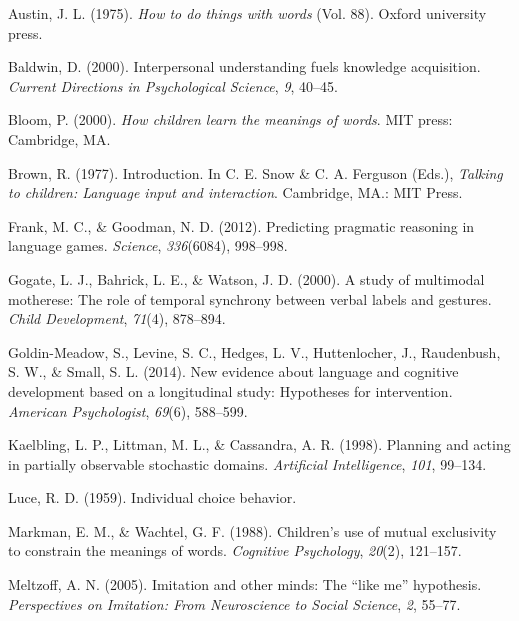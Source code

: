 \documentclass[10pt, letterpaper]{article}
\begin{document}
\setlength{\parindent}{-0.1in} \setlength{\leftskip}{0.125in}

\noindent

\hypertarget{refs}{}
\hypertarget{ref-austin1975}{}
Austin, J. L. (1975). \emph{How to do things with words} (Vol. 88).
Oxford university press.

\hypertarget{ref-baldwin2000}{}
Baldwin, D. (2000). Interpersonal understanding fuels knowledge
acquisition. \emph{Current Directions in Psychological Science},
\emph{9}, 40--45.

\hypertarget{ref-bloom2000}{}
Bloom, P. (2000). \emph{How children learn the meanings of words}. MIT
press: Cambridge, MA.

\hypertarget{ref-brown1977}{}
Brown, R. (1977). Introduction. In C. E. Snow \& C. A. Ferguson (Eds.),
\emph{Talking to children: Language input and interaction}. Cambridge,
MA.: MIT Press.

\hypertarget{ref-frank2012}{}
Frank, M. C., \& Goodman, N. D. (2012). Predicting pragmatic reasoning
in language games. \emph{Science}, \emph{336}(6084), 998--998.

\hypertarget{ref-gogate2000}{}
Gogate, L. J., Bahrick, L. E., \& Watson, J. D. (2000). A study of
multimodal motherese: The role of temporal synchrony between verbal
labels and gestures. \emph{Child Development}, \emph{71}(4), 878--894.

\hypertarget{ref-goldin-meadow2014}{}
Goldin-Meadow, S., Levine, S. C., Hedges, L. V., Huttenlocher, J.,
Raudenbush, S. W., \& Small, S. L. (2014). New evidence about language
and cognitive development based on a longitudinal study: Hypotheses for
intervention. \emph{American Psychologist}, \emph{69}(6), 588--599.

\hypertarget{ref-kaelbling1998}{}
Kaelbling, L. P., Littman, M. L., \& Cassandra, A. R. (1998). Planning
and acting in partially observable stochastic domains. \emph{Artificial
Intelligence}, \emph{101}, 99--134.

\hypertarget{ref-luce1959}{}
Luce, R. D. (1959). Individual choice behavior.

\hypertarget{ref-markman1988}{}
Markman, E. M., \& Wachtel, G. F. (1988). Children's use of mutual
exclusivity to constrain the meanings of words. \emph{Cognitive
Psychology}, \emph{20}(2), 121--157.

\hypertarget{ref-meltzoff2005}{}
Meltzoff, A. N. (2005). Imitation and other minds: The ``like me''
hypothesis. \emph{Perspectives on Imitation: From Neuroscience to Social
Science}, \emph{2}, 55--77.
\end{document}
